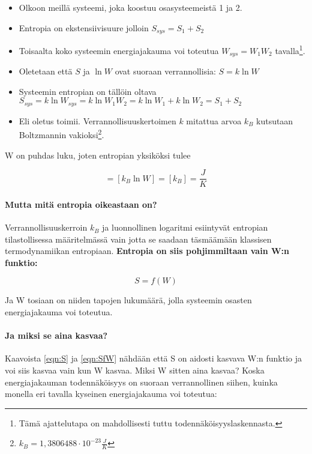 \documentclass[12pt,a4paper,finnish]{book}
\begin{document}
\begin{itemize}
 \item Olkoon meillä systeemi, joka koostuu osasysteemeistä 1 ja 2.
 \item Entropia on ekstensiivisuure jolloin $S_{sys} = S_1 + S_2$
 \item Toisaalta koko systeemin energiajakauma voi toteutua $W_{sys} = W_1W_2$ tavalla\footnote{Tämä ajattelutapa 
 on mahdollisesti tuttu todennäköisyyslaskennasta.}.
 \item Oletetaan että $S$ ja $\ln W$ ovat suoraan verrannollisia: $S = k \ln W$
 \item Systeemin entropian on tällöin oltava\\ $S_{sys} = k\ln W_{sys} = k\ln W_1W_2 = k \ln W_1 + k \ln W_2 = S_1 + S_2$
 \item Eli oletus toimii. Verrannollisuuskertoimen $k$ mitattua arvoa $k_B$ kutsutaan Boltzmannin 
	vakioksi\footnote{$k_B = 1,3806488\cdot10^{-23}\frac{J}{K}$}.
\end{itemize}

W on puhdas luku, joten entropian yksiköksi tulee

\begin{equation}
 [S] = [k_B\ln W] = [k_B] = \frac{J}{K} %
\end{equation}

\paragraph{Mutta mitä entropia oikeastaan on?}

Verrannollisuuskerroin $k_B$ ja luonnollinen logaritmi esiintyvät entropian tilastollisessa määritelmässä vain 
jotta se saadaan täsmäämään klassisen termodynamiikan entropiaan. \textbf{Entropia on siis pohjimmiltaan vain 
W:n funktio:}

\begin{equation}
\label{eqn:SfW}
 S = f(W)
\end{equation}

Ja W tosiaan on niiden tapojen lukumäärä, jolla systeemin osasten energiajakauma voi toteutua. 

\paragraph{Ja miksi se aina kasvaa?}

Kaavoista \ref{eqn:S} ja \ref{eqn:SfW} nähdään että S on aidosti kasvava W:n funktio ja voi siis 
kasvaa vain kun W kasvaa. Miksi W sitten aina kasvaa? Koska energiajakauman todennäköisyys 
on suoraan verrannollinen siihen, kuinka monella eri tavalla kyseinen energiajakauma voi toteutua:
\end{document}
